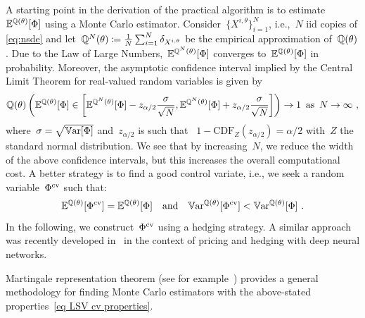 A starting point in the derivation of the practical algorithm is to estimate~$\mathbb{E}^{\mathbb{Q}(\theta)}[\Phi]$ using a Monte Carlo estimator. 
Consider~$\{X^{i,\theta}\}_{i=1}^N$, i.e.,~$N$ iid copies of \eqref{eq:nsde} and let~$\mathbb{Q}^N(\theta)\coloneqq \frac{1}{N}\sum_{i=1}^N \delta_{X^{i,\theta}}$ be the empirical approximation of~$\mathbb{Q}(\theta)$.   
Due to the Law of Large Numbers,~$\mathbb{E}^{\mathbb{Q}^N(\theta)}[\Phi]$ converges to~$\mathbb{E}^{\mathbb{Q}(\theta)}[\Phi]$ in probability. Moreover, the asymptotic confidence interval implied by the Central Limit Theorem for real-valued random variables is given by
\[
\mathbb{Q}(\theta) \left(\mathbb{E}^{\mathbb{Q}(\theta)}[\Phi] \in \left[\mathbb{E}^{\mathbb{Q}^N(\theta)}[\Phi] - z_{\alpha/2}\frac{\sigma}{\sqrt{N}},
\mathbb{E}^{\mathbb{Q}^N(\theta)}[\Phi] + z_{\alpha/2}\frac{\sigma}{\sqrt{N}}\right] \right) \to 1 \,\,\, \text{as}\,\,\, N\to \infty~,
\]
where~$\sigma = \sqrt{\mathbb{V}\mathrm{ar}[\Phi]}$ and~$z_{\alpha/2}$ is such that
~$1-\text{CDF}_Z(z_{\alpha/2})=\alpha/2$ with~$Z$ the standard normal distribution. 
We see that by increasing~$N$, we reduce the width of the above confidence intervals, but this increases the overall computational 
cost. 
A better strategy is to find a good control variate, i.e., we seek a random variable~${\Phi^{\textup{cv}}}$
such that:
\begin{equation}\label{eq LSV cv properties}
\mathbb{E}^{\mathbb{Q}(\theta)}[\Phi^{\textup{cv}}] = \mathbb{E}^{\mathbb{Q}(\theta)}[\Phi] \quad \text{and} \quad \mathbb{V}\mathrm{ar}^{\mathbb{Q}(\theta)}[\Phi^{\textup{cv}}] < \mathbb{V}\mathrm{ar}^{\mathbb{Q}(\theta)}[\Phi]~.
\end{equation}
In the following, we construct~$\Phi^{\textup{cv}}$ using a hedging strategy. A similar approach was recently developed in~\cite{Vidales2018UnbiasedPDEs} in the context of pricing and hedging with deep neural networks.  

Martingale representation theorem (see for example~\cite[Theorem~14.5.1]{Cohen2015StochasticApplications}) provides
a general methodology for finding Monte Carlo estimators with the above-stated properties~\eqref{eq LSV cv properties}. 

